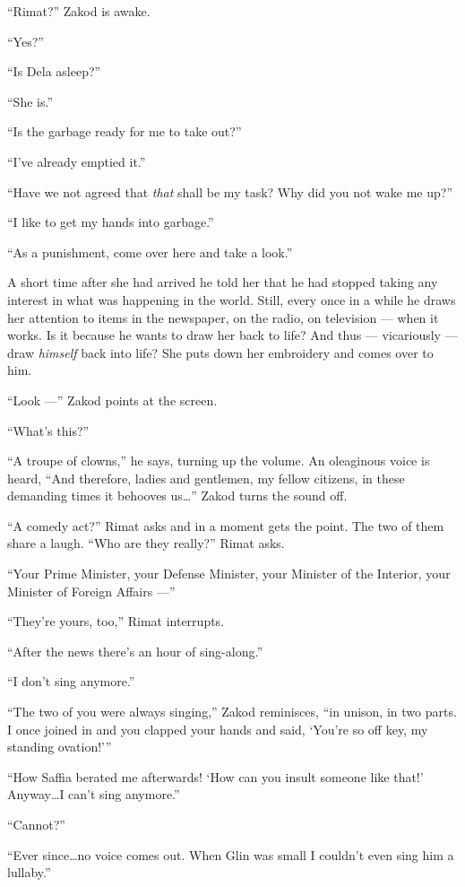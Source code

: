 \documentclass[twoside,11pt,openany]{book}
\begin{document}
``Rimat?'' Zakod is awake.

``Yes?''

``Is Dela asleep?''

``She is.''

``Is the garbage ready for me to take out?''

``I've already emptied it.''

``Have we not agreed that \textit{that} shall be my task? Why did you not wake me up?''

``I like to get my hands into garbage.''

``As a punishment, come over here and take a look.''

A short time after she had arrived he told her that he had stopped taking any interest in what was happening in the
world. Still, every once in a while he draws her attention to items in the newspaper, on the radio, on television ---
when it works. Is it because he wants to draw her back to life? And thus --- vicariously --- draw \textit{himself} back
into life? She puts down her embroidery and comes over to him.

``Look ---'' Zakod points at the screen.

``What's this?''

``A troupe of clowns,'' he says, turning up the volume. An oleaginous voice is heard,
``And therefore, ladies and gentlemen, my fellow citizens, in these demanding times it behooves
us{\ldots}'' Zakod turns the sound off.

``A comedy act?'' Rimat asks and in a moment gets the point. The two of them share a laugh.
``Who are they really?'' Rimat asks.

``Your Prime Minister, your Defense Minister, your Minister of the Interior, your Minister of Foreign
Affairs ---''

``They're yours, too,'' Rimat interrupts.

``After the news there's an hour of sing-along.''

``I don't sing anymore.''

``The two of you were always singing,'' Zakod reminisces, ``in unison, in two
parts. I once joined in and you clapped your hands and said, `You're so off key, my standing ovation!'\thinspace''

``How Saffia berated me afterwards!  `How can you insult someone like that!' Anyway{\ldots}I can't sing
anymore.''

``Cannot?''

``Ever since{\ldots}no voice comes out. When Glin was small I couldn't even sing him a
lullaby.''
\end{document}
